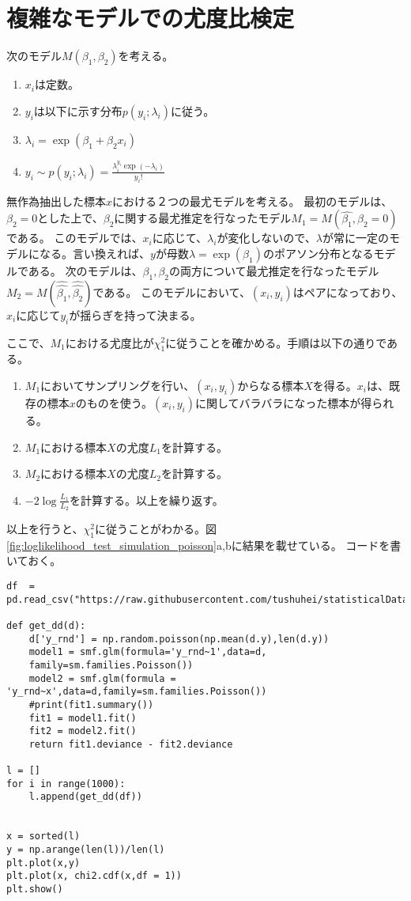 \section{複雑なモデルでの尤度比検定}
次のモデル$M(\beta_1,\beta_2)$を考える。
\begin{enumerate}
    \item $x_i$は定数。
    \item $y_i$は以下に示す分布$p(y_i;\lambda_i)$に従う。
    \item $\lambda_i = \exp(\beta_1+\beta_2 x_i)$
    \item $y_i \sim p(y_i;\lambda_i) = \frac{\lambda_i^{y_i}\exp(-\lambda_i)}{y_i!}$
\end{enumerate}
無作為抽出した標本$x$における２つの最尤モデルを考える。
最初のモデルは、$\beta_2=0$とした上で、$\beta_2$に関する最尤推定を行なったモデル$M_1=M(\hat{\beta_1},\beta_2=0)$である。
このモデルでは、$x_i$に応じて、$\lambda_i$が変化しないので、$\lambda$が常に一定のモデルになる。言い換えれば、$y$が母数$\lambda=\exp(\beta_1)$のポアソン分布となるモデルである。
次のモデルは、$\beta_1,\beta_2$の両方について最尤推定を行なったモデル$M_2=M(\hat{\hat{\beta_1}},\hat{\hat{\beta_2}})$である。
このモデルにおいて、$(x_i,y_i)$はペアになっており、$x_i$に応じて$y_i$が揺らぎを持って決まる。

ここで、$M_1$における尤度比が$\chi_1^2$に従うことを確かめる。手順は以下の通りである。
\begin{enumerate}
    \item $M_1$においてサンプリングを行い、$(x_i,y_i)$からなる標本$X$を得る。$x_i$は、既存の標本$x$のものを使う。$(x_i,y_i)$に関してバラバラになった標本が得られる。
    \item $M_1$における標本$X$の尤度$L_1$を計算する。
    \item $M_2$における標本$X$の尤度$L_2$を計算する。
    \item $-2\log\frac{L_1}{L_2}$を計算する。以上を繰り返す。
\end{enumerate}
以上を行うと、$\chi^2_1$に従うことがわかる。図\ref{fig:loglikelihood_test_simulation_poisson}a,bに結果を載せている。
コードを書いておく。
\begin{lstlisting}
df  = pd.read_csv("https://raw.githubusercontent.com/tushuhei/statisticalDataModeling/master/data3a.csv")

def get_dd(d):
    d['y_rnd'] = np.random.poisson(np.mean(d.y),len(d.y))
    model1 = smf.glm(formula='y_rnd~1',data=d,
    family=sm.families.Poisson())
    model2 = smf.glm(formula = 'y_rnd~x',data=d,family=sm.families.Poisson())
    #print(fit1.summary())
    fit1 = model1.fit()
    fit2 = model2.fit()
    return fit1.deviance - fit2.deviance

l = []
for i in range(1000):
    l.append(get_dd(df))


x = sorted(l)
y = np.arange(len(l))/len(l)
plt.plot(x,y)
plt.plot(x, chi2.cdf(x,df = 1))
plt.show()
\end{lstlisting}


